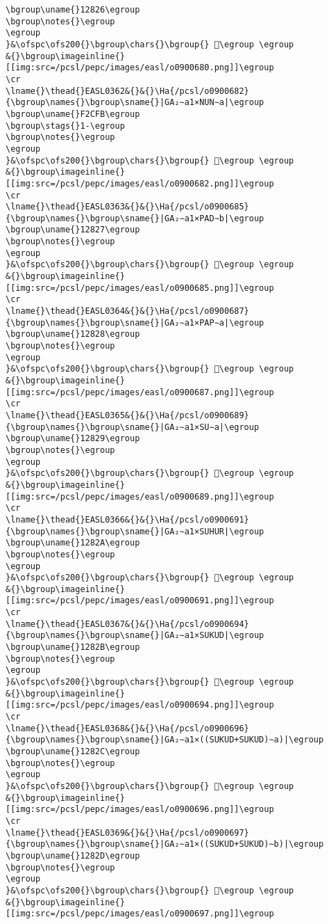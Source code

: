 \begin{verbatim}
\bgroup\uname{}12826\egroup
\bgroup\notes{}\egroup
\egroup
}&\ofspc\ofs200{}\bgroup\chars{}\bgroup{} 𒠦\egroup \egroup
&{}\bgroup\imageinline{}[[img:src=/pcsl/pepc/images/easl/o0900680.png]]\egroup
\cr
\lname{}\thead{}EASL0362&{}&{}\Ha{/pcsl/o0900682}{\bgroup\names{}\bgroup\sname{}|GA₂∼a1×NUN∼a|\egroup
\bgroup\uname{}F2CFB\egroup
\bgroup\stags{}1-\egroup
\bgroup\notes{}\egroup
\egroup
}&\ofspc\ofs200{}\bgroup\chars{}\bgroup{} 󲳻\egroup \egroup
&{}\bgroup\imageinline{}[[img:src=/pcsl/pepc/images/easl/o0900682.png]]\egroup
\cr
\lname{}\thead{}EASL0363&{}&{}\Ha{/pcsl/o0900685}{\bgroup\names{}\bgroup\sname{}|GA₂∼a1×PAD∼b|\egroup
\bgroup\uname{}12827\egroup
\bgroup\notes{}\egroup
\egroup
}&\ofspc\ofs200{}\bgroup\chars{}\bgroup{} 𒠧\egroup \egroup
&{}\bgroup\imageinline{}[[img:src=/pcsl/pepc/images/easl/o0900685.png]]\egroup
\cr
\lname{}\thead{}EASL0364&{}&{}\Ha{/pcsl/o0900687}{\bgroup\names{}\bgroup\sname{}|GA₂∼a1×PAP∼a|\egroup
\bgroup\uname{}12828\egroup
\bgroup\notes{}\egroup
\egroup
}&\ofspc\ofs200{}\bgroup\chars{}\bgroup{} 𒠨\egroup \egroup
&{}\bgroup\imageinline{}[[img:src=/pcsl/pepc/images/easl/o0900687.png]]\egroup
\cr
\lname{}\thead{}EASL0365&{}&{}\Ha{/pcsl/o0900689}{\bgroup\names{}\bgroup\sname{}|GA₂∼a1×SU∼a|\egroup
\bgroup\uname{}12829\egroup
\bgroup\notes{}\egroup
\egroup
}&\ofspc\ofs200{}\bgroup\chars{}\bgroup{} 𒠩\egroup \egroup
&{}\bgroup\imageinline{}[[img:src=/pcsl/pepc/images/easl/o0900689.png]]\egroup
\cr
\lname{}\thead{}EASL0366&{}&{}\Ha{/pcsl/o0900691}{\bgroup\names{}\bgroup\sname{}|GA₂∼a1×SUHUR|\egroup
\bgroup\uname{}1282A\egroup
\bgroup\notes{}\egroup
\egroup
}&\ofspc\ofs200{}\bgroup\chars{}\bgroup{} 𒠪\egroup \egroup
&{}\bgroup\imageinline{}[[img:src=/pcsl/pepc/images/easl/o0900691.png]]\egroup
\cr
\lname{}\thead{}EASL0367&{}&{}\Ha{/pcsl/o0900694}{\bgroup\names{}\bgroup\sname{}|GA₂∼a1×SUKUD|\egroup
\bgroup\uname{}1282B\egroup
\bgroup\notes{}\egroup
\egroup
}&\ofspc\ofs200{}\bgroup\chars{}\bgroup{} 𒠫\egroup \egroup
&{}\bgroup\imageinline{}[[img:src=/pcsl/pepc/images/easl/o0900694.png]]\egroup
\cr
\lname{}\thead{}EASL0368&{}&{}\Ha{/pcsl/o0900696}{\bgroup\names{}\bgroup\sname{}|GA₂∼a1×((SUKUD+SUKUD)∼a)|\egroup
\bgroup\uname{}1282C\egroup
\bgroup\notes{}\egroup
\egroup
}&\ofspc\ofs200{}\bgroup\chars{}\bgroup{} 𒠬\egroup \egroup
&{}\bgroup\imageinline{}[[img:src=/pcsl/pepc/images/easl/o0900696.png]]\egroup
\cr
\lname{}\thead{}EASL0369&{}&{}\Ha{/pcsl/o0900697}{\bgroup\names{}\bgroup\sname{}|GA₂∼a1×((SUKUD+SUKUD)∼b)|\egroup
\bgroup\uname{}1282D\egroup
\bgroup\notes{}\egroup
\egroup
}&\ofspc\ofs200{}\bgroup\chars{}\bgroup{} 𒠭\egroup \egroup
&{}\bgroup\imageinline{}[[img:src=/pcsl/pepc/images/easl/o0900697.png]]\egroup

\end{verbatim}
